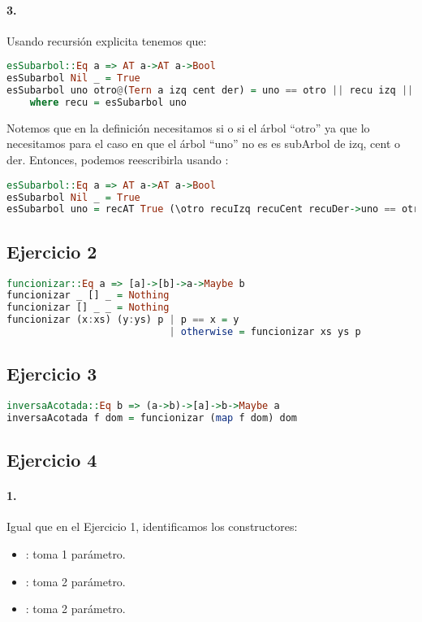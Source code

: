 \paragraph{3.} Usando recursión explicita tenemos que:

\begin{lstlisting}[language=Haskell]
esSubarbol::Eq a => AT a->AT a->Bool
esSubarbol Nil _ = True
esSubarbol uno otro@(Tern a izq cent der) = uno == otro || recu izq || recu cent || recu der
    where recu = esSubarbol uno
\end{lstlisting}

Notemos que en la definición necesitamos si o si el árbol ``otro'' ya que lo necesitamos para el caso en que el árbol ``uno'' no es es subArbol de izq, cent o der. Entonces, podemos reescribirla usando :

\begin{lstlisting}[language=Haskell]
esSubarbol::Eq a => AT a->AT a->Bool
esSubarbol Nil _ = True
esSubarbol uno = recAT True (\otro recuIzq recuCent recuDer->uno == otro || recuIzq || recuCent || recuDer)
\end{lstlisting}


\subsection*{Ejercicio 2}
\begin{lstlisting}[language=Haskell]
funcionizar::Eq a => [a]->[b]->a->Maybe b
funcionizar _ [] _ = Nothing
funcionizar [] _ _ = Nothing
funcionizar (x:xs) (y:ys) p | p == x = y
                            | otherwise = funcionizar xs ys p
\end{lstlisting}

\subsection*{Ejercicio 3}
\begin{lstlisting}[language=Haskell]
inversaAcotada::Eq b => (a->b)->[a]->b->Maybe a
inversaAcotada f dom = funcionizar (map f dom) dom
\end{lstlisting}

\subsection*{Ejercicio 4}
\paragraph{1.} Igual que en el Ejercicio 1, identificamos los constructores:
\begin{itemize}
  \item {}: toma 1 parámetro.
  \item {}: toma 2 parámetro.
  \item {}: toma 2 parámetro.
\end{itemize}

